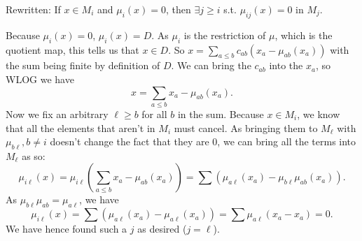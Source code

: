 \documentclass[a4paper]{exam}
\begin{document}
\begin{questions}
	Rewritten: If $x\in M_i $ and $\mu _i(x) = 0 $, then $\exists j \ge i $ s.t. $\mu _{ij}(x) = 0 $ in $M_j $.
	\begin{solution}
		Because $\mu _i(x) = 0 $, $\mu _i(x) = D $.
		As $\mu _i $ is the restriction of $\mu  $, which is the quotient map, this tells us that $x \in D$.
		So $x =\sum_{a \le b} c_{ab}(x_a - \mu_{ab}(x_a))$ with the sum being finite by definition of $D$.
		We can bring the $c_{ab} $ into the $x_a $, so WLOG we have
		\[
			x = \sum_{a\le b} x_a - \mu _{ab}(x_a)
		.\] 
		Now we fix an arbitrary $\ell \ge b $ for all $b $ in the sum.
		Because $x \in M_i $, we know that all the elements that aren't in $M_i $ must cancel.
		As bringing them to $M_\ell $ with $\mu _{b\ell}, b\ne i$ doesn't change the fact that they are 0, we can bring all the terms into $M_{\ell} $ as so:
		\[
			\mu _{i\ell}(x) = \mu_{i\ell}(\sum_{a\le b} x_a - \mu _{ab}(x_a)) =\sum (\mu _{a\ell}(x_a) - \mu _{b\ell}\mu _{ab}(x_a))
		.\] 
		As $\mu _{b\ell} \mu _{ab} = \mu _{a\ell}$, we have
		\[
			\mu_{i\ell}(x) = \sum (\mu _{a\ell}(x_a) - \mu_{a\ell}(x_a)) = \sum \mu _{a\ell}(x_a-x_a) = 0
		.\] 
		We have hence found such a $j $ as desired ($j=\ell $).

	\end{solution}


\end{questions}
\end{document}
